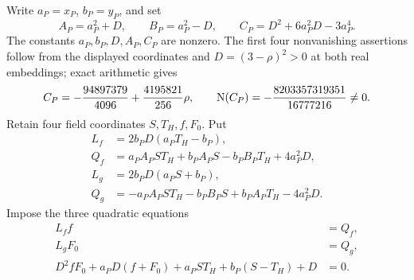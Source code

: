 \documentclass[11pt,a4paper]{article}
\begin{document}
Write $a_P=x_P$, $b_P=y_P$, and set
\[
 A_P=a_P^2+D,\qquad B_P=a_P^2-D,\qquad
 C_P=D^2+6a_P^2D-3a_P^4.
\]
The constants $a_P,b_P,D,A_P,C_P$ are nonzero. The first four
nonvanishing assertions follow from the displayed coordinates and
$D=(3-\rho)^2>0$ at both real embeddings; exact arithmetic gives
\[
 C_P=-\frac{94897379}{4096}+\frac{4195821}{256}\rho,
 \qquad \operatorname{N}(C_P)=-\frac{8203357319351}{16777216}\ne0.
\]
Retain four field coordinates $S,T_H,f,F_0$. Put
\begin{align*}
 L_f&=2b_PD(a_PT_H-b_P),\\
 Q_f&=a_PA_PST_H+b_PA_PS-b_PB_PT_H+4a_P^2D,\\
 L_g&=2b_PD(a_PS+b_P),\\
 Q_g&=-a_PA_PST_H-b_PB_PS+b_PA_PT_H-4a_P^2D.
\end{align*}
Impose the three quadratic equations
\begin{equation}\label{eq:H}
 \begin{split}
 L_ff&=Q_f,\\
 L_gF_0&=Q_g,\\
 D^2fF_0+a_PD(f+F_0)+a_PST_H+b_P(S-T_H)+D&=0.
 \end{split}
\end{equation}
\end{document}
